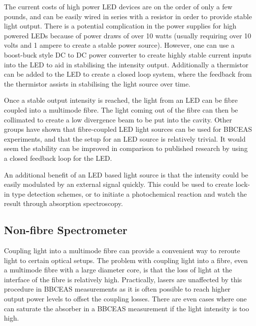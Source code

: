 The current costs of high power \ac{LED} devices are on the order of only
a few pounds, and can be easily wired in series with a resistor in order
to provide stable light output. There is a potential complication in the
power supplies for high powered \acp{LED} because of power draws of over 10
watts (usually requiring over 10 volts and 1 ampere to create a stable power
source). However, one can use a boost-buck style DC to DC power converter to
create highly stable current inputs into the \ac{LED} to aid in stabilising
the intensity output. Additionally a thermistor can be added to the \ac{LED}
to create a closed loop system, where the feedback from the thermistor assists
in stabilising the light source over time.

Once a stable output intensity is reached, the light from an \ac{LED} can be
fibre coupled into a multimode fibre. The light coming out of the fibre can
then be collimated to create a low divergence beam to be put into the cavity.
Other groups have shown that fibre-coupled \ac{LED} light sources can be used
for \ac{BBCEAS} experiments, and that the setup for an \ac{LED} source is
relatively trivial. It would seem the stability can be improved in comparison
to published research by using a closed feedback loop for the \ac{LED}.

An additional benefit of an \ac{LED} based light source is that the intensity
could be easily modulated by an external signal quickly. This could be used to
create lock-in type detection schemes, or to initiate a photochemical reaction
and watch the result through absorption spectroscopy.

\subsection{Non-fibre Spectrometer}

Coupling light into a multimode fibre can provide a convenient way to reroute
light to certain optical setups. The problem with coupling light into a fibre,
even a multimode fibre with a large diameter core, is that the loss of light
at the interface of the fibre is relatively high. Practically, lasers are
unaffected by this procedure in \ac{BBCEAS} measurements as it is often
possible to reach higher output power levels to offset the coupling losses.
There are even cases where one can saturate the absorber in a \ac{BBCEAS}
measurement if the light intensity is too high.

